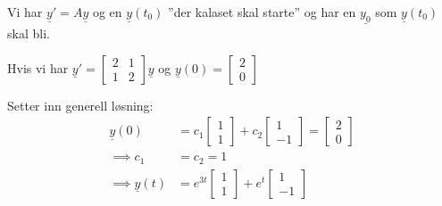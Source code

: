 \documentclass[11pt, a4paper, norsk]{article}
\begin{document}
            Vi har $\underline{y}' = A\underline{y}$ og en $\underline{y}(t_0)$ ''der kalaset skal starte'' og har en $\underline{y_0}$ som $\underline{y}(t_0)$ skal bli.

            Hvis vi har $\underline{y}' = \begin{bmatrix}
                2 & 1 \\
                1 & 2
            \end{bmatrix}\underline{y}$ og $\underline{y}(0) = \begin{bmatrix}
                2 \\
                0
            \end{bmatrix}$

            Setter inn generell løsning:
            \begin{align*}
                \underline{y}(0) &= c_1\begin{bmatrix}
                    1 \\
                    1
                \end{bmatrix} + c_2\begin{bmatrix}
                    1 \\
                    -1
                \end{bmatrix} = \begin{bmatrix}
                    2 \\
                    0
                \end{bmatrix}
                \\
                    \implies c_1 &= c_2 = 1
                    \\
                    \implies \underline{y}(t) &= e^{3t}\begin{bmatrix}
                        1 \\
                        1
                    \end{bmatrix} + e^{t}\begin{bmatrix}
                        1 \\
                        -1
                    \end{bmatrix}
            \end{align*}
\end{document}
